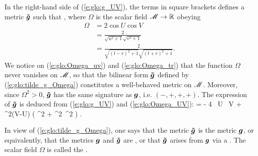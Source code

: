 In the right-hand side of (\ref{e:glo:g_UV}),
the terms in square brackets defines a metric
$\bm{\tilde{g}}$ such that
\be \label{e:glo:tilde_g_Omega}
     ,
\ee
where $\Omega$ is the scalar field $\mathscr{M} \rightarrow \mathbb{R}$ obeying
\begin{subequations}
\begin{align}
    \Omega & =  2 \cos U \cos V \label{e:glo:Omega_UV} \\
           & =  \frac{2}{\sqrt{u^2+1}\sqrt{v^2+1}} \label{e:glo:Omega_uv}\\
           & =  \frac{2}{\sqrt{(t-r)^2+1}\sqrt{(t+r)^2+1}} . \label{e:glo:Omega_tr}
\end{align}
\end{subequations}
We notice on (\ref{e:glo:Omega_uv}) and (\ref{e:glo:Omega_tr}) that the function
$\Omega$ never vanishes on $\mathscr{M}$, so that the bilinear form $\bm{\tilde{g}}$ defined by
(\ref{e:glo:tilde_g_Omega}) constitutes a well-behaved metric on $\mathscr{M}$.
Moreover, since $\Omega^2 > 0$, $\bm{\tilde{g}}$ has the same signature as
$\bm{g}$, i.e. $(-,+,+,+)$.
The expression of $\bm{\tilde{g}}$ is deduced from (\ref{e:glo:g_UV})
and (\ref{e:glo:Omega_UV}):
\be \label{e:glo:tg_UV}
     =  - 4 \, \dd U \, \dd V
        + \sin^2(V-U) \left(  \dd\th^2 + \sin^2\th \, \dd\ph^2 \right) .
\ee

In view of (\ref{e:glo:tilde_g_Omega}), one says that the metric $\bm{\tilde{g}}$
is  the metric $\bm{g}$, or equivalently,
that the metrics $\bm{g}$ and $\bm{\tilde{g}}$ are
,
or that $\bm{\tilde{g}}$ arises from $\bm{g}$ via a
.
The scalar field $\Omega$ is called the .

